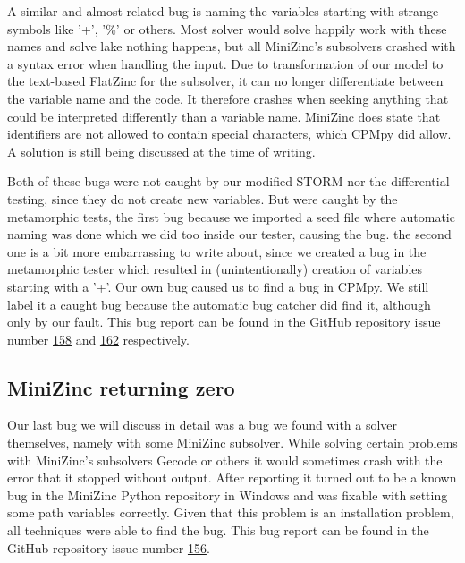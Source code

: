 A similar and almost related bug is naming the variables starting with strange symbols like '+', '\%' or others. Most solver would solve happily work with these names and solve lake nothing happens, but all MiniZinc's subsolvers crashed with a syntax error when handling the input. Due to transformation of our model to the text-based FlatZinc for the subsolver, it can no longer differentiate between the variable name and the code. It therefore crashes when seeking anything that could be interpreted differently than a variable name. MiniZinc does state that identifiers  are not allowed to contain special characters, which CPMpy did allow. A solution is still being discussed at the time of writing.


Both of these bugs were not caught by our modified STORM nor the differential testing, since they do not create new variables. But were caught by the metamorphic tests, the first bug because we imported a seed file where automatic naming was done which we did too inside our tester, causing the bug. the second one is a bit more embarrassing to write about, since we created a bug in the metamorphic tester which resulted in (unintentionally) creation of variables starting with a '+'. Our own bug caused us to find a bug in CPMpy. We still label it a caught bug because the automatic bug catcher did find it, although only by our fault. This bug report can be found in the GitHub repository issue number \href{https://github.com/CPMpy/cpmpy/issues/158}{158} and \href{https://github.com/CPMpy/cpmpy/issues/162}{162} respectively.


\subsection{MiniZinc returning zero}
\label{res:bug:MinizincZero}
Our last bug we will discuss in detail was a bug we found with a solver themselves, namely with some MiniZinc subsolver. While solving certain problems with MiniZinc's subsolvers Gecode or others it would sometimes crash with the error that it stopped without output. After reporting it turned out to be a known bug in the MiniZinc Python repository in Windows and was fixable with setting some path variables correctly. Given that this problem is an installation problem, all techniques were able to find the bug. This bug report can be found in the GitHub repository issue number \href{https://github.com/CPMpy/cpmpy/issues/156}{156}.

%
%



